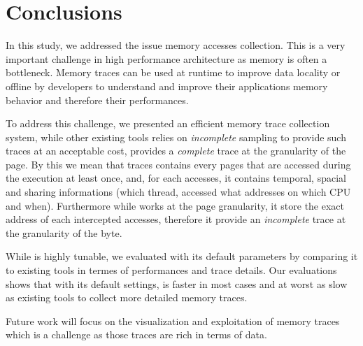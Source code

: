 \section{Conclusions}
\label{sec:cncl}

In this study, we addressed the issue memory accesses collection. This is a
very important challenge in high performance architecture as memory is often a
bottleneck. Memory traces can be used at runtime to improve data locality or
offline by developers to understand and improve their applications memory
behavior and therefore their performances.

To address this challenge, we  presented \Moca an efficient memory trace
collection system, while other existing tools relies on \emph{incomplete} sampling to
provide such traces at an acceptable cost, \Moca provides a \emph{complete}
trace at the granularity of the page. By this we mean that \Moca traces
contains every pages that are accessed during the execution at least once,
and, for each accesses, it contains temporal, spacial and sharing
informations (which thread, accessed what addresses on which CPU and when).
Furthermore while \Moca works at the page granularity, it store the exact
address of each intercepted accesses, therefore it provide an
\emph{incomplete} trace at the granularity of the byte.

While \Moca is highly tunable, we evaluated with its default parameters by
comparing it to existing tools in termes of performances and trace details.
Our evaluations shows that with its default settings, \Moca is faster in most
cases and at worst as slow as existing tools to collect more detailed memory
traces.

Future work will focus on the visualization and exploitation of memory traces
which is a challenge as those traces are rich in terms of data.
